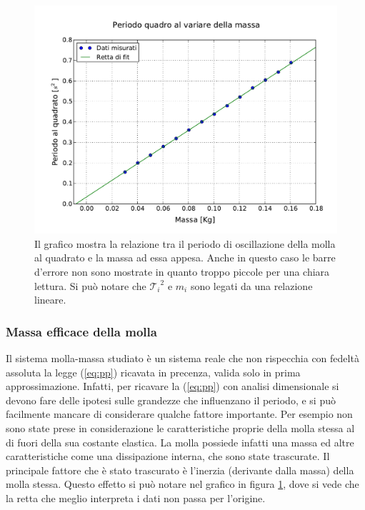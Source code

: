\begin{figure}
    \centering
    \includegraphics[width=120mm]{immagini/periodo2_massa.pdf}
    \caption{Il grafico mostra la relazione tra il periodo di oscillazione della molla al quadrato e la massa ad essa appesa.
        Anche in questo caso le barre d'errore non sono mostrate in quanto troppo piccole per una chiara lettura.
        Si può notare che ${\mathcal{T}_i}^2$ e $m_i$ sono legati da una relazione lineare.}
    \label{fig:periodo2_massa}
\end{figure}

\subsubsection{Massa efficace della molla}

Il sistema molla-massa studiato è un sistema reale che non rispecchia con fedeltà assoluta la legge (\ref{eq:pp}) ricavata in precenza, valida solo in prima approssimazione. Infatti, per ricavare la (\ref{eq:pp}) con analisi dimensionale
si devono fare delle ipotesi sulle grandezze che influenzano il periodo, e si può facilmente mancare di considerare qualche
fattore importante. Per esempio non sono state prese in considerazione le caratteristiche proprie della molla stessa
al di fuori della sua costante elastica. La molla possiede infatti una massa ed altre caratteristiche
come una dissipazione interna, che sono state trascurate. Il principale fattore che è stato trascurato
è l'inerzia (derivante dalla massa) della molla stessa. Questo effetto si può notare nel grafico in figura \ref{fig:periodo2_massa},
dove si vede che la retta che meglio interpreta i dati non passa per l'origine.

